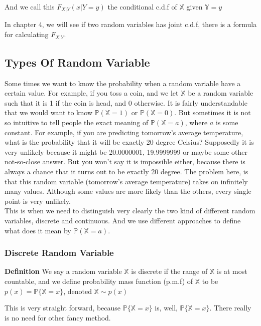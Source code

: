 \documentclass[a4paper,12pt]{article}
\begin{document}
And we call this $F_{X|Y}(x|Y=y)$ the conditional c.d.f of $\mathbb{X}$ given $\mathbb{Y} = y$

In chapter 4, we will see if two random variables has joint c.d.f, there is a formula for calculating $F_{X|Y}$.

\subsection{Types Of Random Variable}
Some times we want to know the probability when a random variable have a certain value. For example, if you toss a coin, and we let $\mathbb{X}$ be a random variable such that it is 1 if the coin is head, and 0 otherwise. It is fairly understandable that we would want to know $\mathbb{P}(\mathbb{X} = 1)$ or $\mathbb{P}(\mathbb{X} = 0)$. But sometimes it is not so intuitive to tell people the exact meaning of $\mathbb{P}(\mathbb{X} = a)$, where $a$ is some constant. For example, if you are predicting tomorrow's average temperature, what is the probability that it will be exactly 20 degree Celsius? Supposedly it is very unlikely because it might be 20.0000001, 19.9999999 or 
maybe some other not-so-close answer. But you won't say it is impossible either, because there is always a chance that it turns out to be exactly 20 degree. The problem here, is that this random variable (tomorrow's average temperature) takes on infinitely many values. Although some values are more likely than the others, every single point is very unlikely.\\

This is when we need to distinguish very clearly the two kind of different random variables, discrete and continuous. And we use different approaches to define what does it mean by $\mathbb{P}(\mathbb{X} = a)$.

\subsubsection{Discrete Random Variable}
\textbf{Definition}
We say a random variable $\mathbb{X}$ is discrete if the range of $\mathbb{X}$ is at most countable, and we define probability mass function (p.m.f) of $\mathbb{X}$ to be
$p(x) = \mathbb{P}\{\mathbb{X}=x\}$, denoted $\mathbb{X} \sim p(x)$

This is very straight forward, because $\mathbb{P}\{\mathbb{X}=x\}$ is, well, $\mathbb{P}\{\mathbb{X}=x\}$. There really is no need for other fancy method.\\
\end{document}
